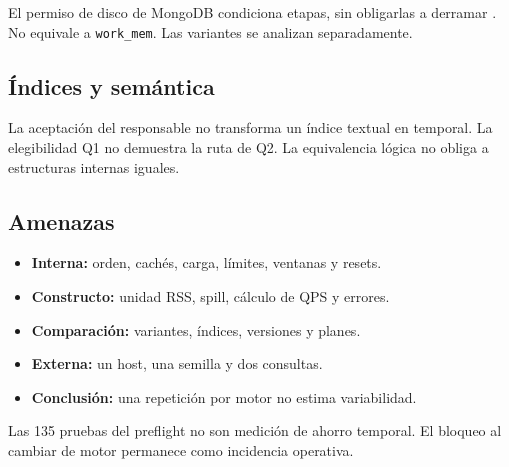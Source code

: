 El permiso de disco de MongoDB condiciona etapas, sin obligarlas a
derramar \cite{mongolimits}. No equivale a \texttt{work\_mem}.
Las variantes se analizan separadamente.

\subsection{Índices y semántica}
La aceptación del responsable no transforma un índice textual en temporal.
La elegibilidad Q1 no demuestra la ruta de Q2. La equivalencia lógica
no obliga a estructuras internas iguales.

\subsection{Amenazas}
\begin{itemize}
\item \textbf{Interna:} orden, cachés, carga, límites, ventanas y resets.
\item \textbf{Constructo:} unidad RSS, spill, cálculo de QPS y errores.
\item \textbf{Comparación:} variantes, índices, versiones y planes.
\item \textbf{Externa:} un host, una semilla y dos consultas.
\item \textbf{Conclusión:} una repetición por motor no estima variabilidad.
\end{itemize}
Las 135 pruebas del preflight no son medición de ahorro temporal.
El bloqueo al cambiar de motor permanece como incidencia operativa.
